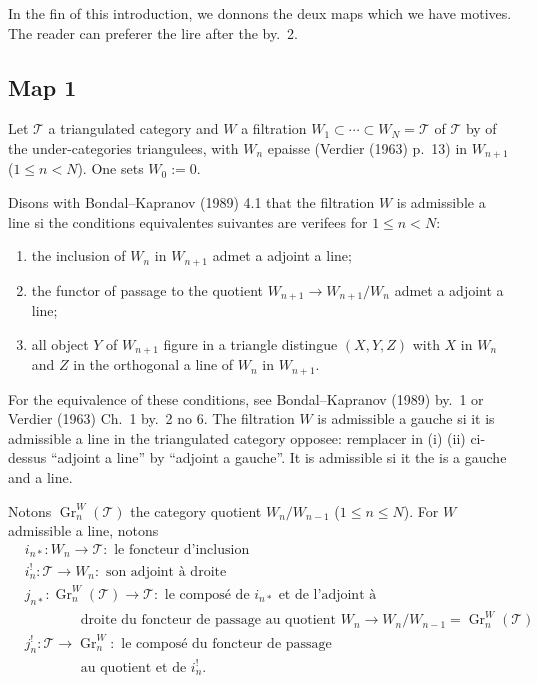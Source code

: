 \documentclass[11pt,a4paper]{article}
\theoremstyle{plain}
\theoremstyle{definition}
\DeclareMathOperator{\Gr}{Gr}
\newcommand{\cT}{\mathscr{T}}
\begin{document}
In the fin of this introduction, we donnons the deux maps which we have motives. The reader can preferer the lire after the by.~2.

\subsection*{Map 1}

Let $\cT$ a triangulated category and $W$ a filtration $W_1 \subset \cdots \subset W_N = \cT$ of $\cT$ by of the under-categories triangulees, with $W_n$ epaisse (Verdier (1963) p.~13) in $W_{n+1}$ ($1 \leq n < N$). One sets $W_0 := 0$.

Disons with Bondal--Kapranov (1989) 4.1 that the filtration $W$ is admissible a line si the conditions equivalentes suivantes are verifees for $1 \leq n < N$:
\begin{enumerate}[label=(\roman*)]
\item the inclusion of $W_n$ in $W_{n+1}$ admet a adjoint a line;
\item the functor of passage to the quotient $W_{n+1} \to W_{n+1}/W_n$ admet a adjoint a line;
\item all object $Y$ of $W_{n+1}$ figure in a triangle distingue $(X, Y, Z)$ with $X$ in $W_n$ and $Z$ in the orthogonal a line of $W_n$ in $W_{n+1}$.
\end{enumerate}
For the equivalence of these conditions, see Bondal--Kapranov (1989) by.~1 or Verdier (1963) Ch.~1 by.~2 no 6. The filtration $W$ is admissible a gauche si it is admissible a line in the triangulated category opposee: remplacer in (i) (ii) ci-dessus ``adjoint a line'' by ``adjoint a gauche''. It is admissible si it the is a gauche and a line.

Notons $\Gr_n^W(\cT)$ the category quotient $W_n/W_{n-1}$ ($1 \leq n \leq N$). For $W$ admissible a line, notons
\begin{align*}
&i_{n*} : W_n \to \cT : \text{ le foncteur d'inclusion} \\
&i_n^! : \cT \to W_n : \text{ son adjoint \`a droite} \\
&j_{n*} : \Gr_n^W(\cT) \to \cT : \text{ le compos\'e de } i_{n*} \text{ et de l'adjoint \`a} \\
&\qquad\qquad\text{droite du foncteur de passage au quotient } W_n \to W_n/W_{n-1} = \Gr_n^W(\cT) \\
&j_n^! : \cT \to \Gr_n^W : \text{ le compos\'e du foncteur de passage} \\
&\qquad\qquad\text{au quotient et de } i_n^!.
\end{align*}
\end{document}

